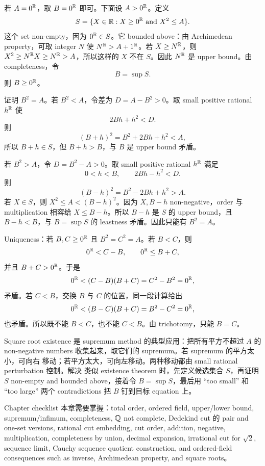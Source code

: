 \begin{solution}
若 \(A=0^{\mathbb{R}}\)，取 \(B=0^{\mathbb{R}}\) 即可。下面设 \(A>0^{\mathbb{R}}\)。定义
\[
  S=\{X\in\mathbb{R}: X\geq0^{\mathbb{R}}\text{ and }X^2\leq A\}.
\]
这个 set non-empty，因为 \(0^{\mathbb{R}}\in S\)。它 bounded above：由 Archimedean
property，可取 integer \(N\) 使 \(N^{\mathbb{R}}>A+1^{\mathbb{R}}\)。若 \(X\geq N^{\mathbb{R}}\)，则
\(X^2\geq N^{\mathbb{R}}X\geq N^{\mathbb{R}}>A\)，所以这样的 \(X\) 不在 \(S\)。因此 \(N^{\mathbb{R}}\)
是 upper bound。由 completeness，令
\[
  B=\sup S.
\]
则 \(B\geq0^{\mathbb{R}}\)。

证明 \(B^2=A\)。若 \(B^2<A\)，令差为 \(D=A-B^2>0\)。取 small positive rational
\(h^{\mathbb{R}}\) 使
\[
  2Bh+h^2<D.
\]
则
\[
  (B+h)^2=B^2+2Bh+h^2<A,
\]
所以 \(B+h\in S\)，但 \(B+h>B\)，与 \(B\) 是 upper bound 矛盾。

若 \(B^2>A\)，令 \(D=B^2-A>0\)。取 small positive rational \(h^{\mathbb{R}}\) 满足
\[
  0<h<B,\qquad 2Bh-h^2<D.
\]
则
\[
  (B-h)^2=B^2-2Bh+h^2>A.
\]
若 \(X\in S\)，则 \(X^2\leq A<(B-h)^2\)。因为 \(X,B-h\) non-negative，order 与
multiplication 相容给 \(X\leq B-h\)。所以 \(B-h\) 是 \(S\) 的 upper bound，且
\(B-h<B\)，与 \(B=\sup S\) 的 leastness 矛盾。因此只能有 \(B^2=A\)。

Uniqueness：若 \(B,C\geq0^{\mathbb{R}}\) 且 \(B^2=C^2=A\)。若 \(B<C\)，则
\[
  0^{\mathbb{R}}<C-B,\qquad 0^{\mathbb{R}}\leq B+C,
\]
并且 \(B+C>0^{\mathbb{R}}\)。于是
\[
  0^{\mathbb{R}}<(C-B)(B+C)=C^2-B^2=0^{\mathbb{R}},
\]
矛盾。若 \(C<B\)，交换 \(B\) 与 \(C\) 的位置，同一段计算给出
\[
  0^{\mathbb{R}}<(B-C)(B+C)=B^2-C^2=0^{\mathbb{R}},
\]
也矛盾。所以既不能 \(B<C\)，也不能 \(C<B\)。由 trichotomy，只能 \(B=C\)。
\end{solution}

\begin{explanation}
Square root existence 是 supremum method 的典型应用：把所有平方不超过 \(A\) 的
non-negative numbers 收集起来，取它们的 supremum。若 supremum 的平方太小，可向右
移动；若平方太大，可向左移动。两种移动都由 small rational perturbation 控制。解决
类似 existence theorem 时，先定义候选集合 \(S\)，再证明 \(S\) non-empty and
bounded above，接着令 \(B=\sup S\)，最后用 ``too small'' 和 ``too large'' 两个
contradictions 把 \(B\) 钉到目标 equation 上。
\end{explanation}

\begin{reviewbox}{Chapter checklist}
本章需要掌握：total order, ordered field, upper/lower bound, supremum/infimum,
completeness, \(\mathbb{Q}\) not complete, Dedekind cut 的 pair and one-set versions,
rational cut embedding, cut order, addition, negative, multiplication, completeness
by union, decimal expansion, irrational cut for \(\sqrt2\), sequence limit,
Cauchy sequence quotient construction, and ordered-field consequences such as
inverse, Archimedean property, and square roots。
\end{reviewbox}
